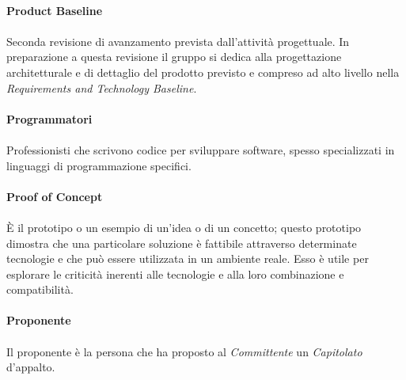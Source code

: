 \documentclass[10pt, a4paper]{article}
\begin{document}
\vspace{2em}
\paragraph{Product Baseline}\noindent\hrulefill
\paragraph{}Seconda revisione di avanzamento prevista dall’attività progettuale. In preparazione a questa revisione il gruppo si dedica alla progettazione architetturale e di dettaglio del prodotto previsto e compreso ad alto livello nella \textit{Requirements and Technology Baseline\pg}.

\vspace{2em}
\paragraph{Programmatori}\noindent\hrulefill
\paragraph{}Professionisti che scrivono codice per sviluppare software, spesso specializzati in linguaggi di programmazione specifici.


\vspace{2em}
\paragraph{Proof of Concept}\noindent\hrulefill
\paragraph{}È il prototipo o un esempio di un’idea o di un concetto; questo prototipo dimostra che una particolare soluzione è fattibile attraverso determinate tecnologie e che può essere utilizzata in un ambiente reale. Esso è utile per esplorare le criticità inerenti alle tecnologie e alla loro combinazione e compatibilità.

\vspace{2em}
\paragraph{Proponente}\noindent\hrulefill
\paragraph{}Il proponente è la persona che ha proposto al \textit{Committente\pg} un \textit{Capitolato\pg}
d’appalto.
\end{document}
